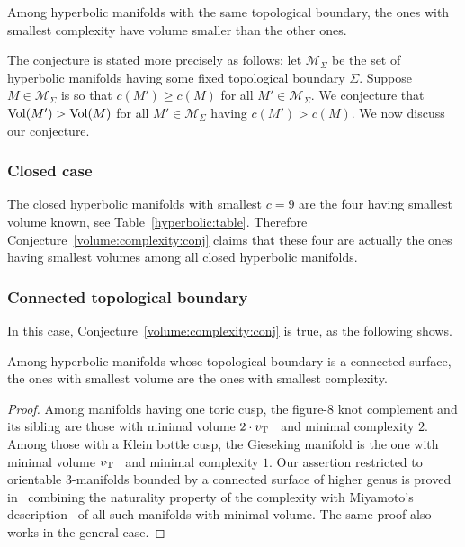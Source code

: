 \documentclass[10pt]{article}      %
\newcommand{\calM} {\ensuremath {\mathcal{M}}}
\newcommand{\Vol}{{\rm Vol}}
\newcommand{\voltet}{v_{\rm T}}
\begin{document}
\begin{conjecture} \label{volume:complexity:conj}
Among hyperbolic manifolds with the same topological boundary, the ones with
smallest complexity have volume smaller than the other ones.
\end{conjecture}
The conjecture is stated more precisely as follows:
let $\calM_{\Sigma}$ be the set of hyperbolic manifolds having some fixed topological
boundary $\Sigma$. Suppose $M\in\calM_{\Sigma}$ is so that $c(M')\geqslant c(M)$ for all
$M'\in\calM_{\Sigma}$. We conjecture that $\Vol(M')>\Vol(M)$
for all $M'\in\calM_{\Sigma}$ having $c(M')>c(M)$.
We now discuss our conjecture.

\subsubsection{Closed case}
The closed hyperbolic manifolds with smallest $c=9$ are the four having smallest
volume known, see Table~\ref{hyperbolic:table}. Therefore
Conjecture~\ref{volume:complexity:conj} claims that these four are actually the ones
having smallest volumes among all closed hyperbolic manifolds.

\subsubsection{Connected topological boundary}
In this case, Conjecture~\ref{volume:complexity:conj} is true, as the following
shows.
\begin{theorem} \label{connected:surface:teo}
Among hyperbolic manifolds whose topological boundary is a connected surface,
the ones with smallest volume are the ones with smallest complexity.
\end{theorem}
\begin{proof}
Among manifolds having one toric cusp,
the figure-8 knot complement and its sibling are those with minimal volume
$2\cdot\voltet$~\cite{CaMe} and minimal complexity $2$. Among those with a Klein bottle cusp,
the Gieseking manifold is the one with minimal volume $\voltet$~\cite{Ad} 
and minimal complexity $1$. Our assertion restricted to orientable 3-manifolds
bounded by a connected surface of higher genus is proved in~\cite{FriMaPe} combining
the naturality property of the complexity with
Miyamoto's description~\cite{Miy} of all such manifolds with minimal volume. 
The same proof also works in the general case.
\end{proof}
\end{document}

